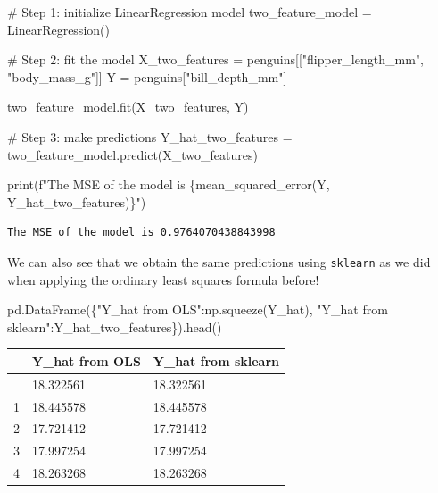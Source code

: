 \documentclass[
  letterpaper,
  DIV=11,
  numbers=noendperiod]{scrreprt}
\newenvironment{Shaded}{\begin{snugshade}}{\end{snugshade}}
\newcommand{\BuiltInTok}[1]{\textcolor[rgb]{0.00,0.23,0.31}{#1}}
\newcommand{\CommentTok}[1]{\textcolor[rgb]{0.37,0.37,0.37}{#1}}
\newcommand{\NormalTok}[1]{\textcolor[rgb]{0.00,0.23,0.31}{#1}}
\newcommand{\OperatorTok}[1]{\textcolor[rgb]{0.37,0.37,0.37}{#1}}
\newcommand{\SpecialCharTok}[1]{\textcolor[rgb]{0.37,0.37,0.37}{#1}}
\newcommand{\SpecialStringTok}[1]{\textcolor[rgb]{0.13,0.47,0.30}{#1}}
\newcommand{\StringTok}[1]{\textcolor[rgb]{0.13,0.47,0.30}{#1}}
\begin{document}
\begin{Shaded}
\begin{Highlighting}[]
\CommentTok{\# Step 1: initialize LinearRegression model}
\NormalTok{two\_feature\_model }\OperatorTok{=}\NormalTok{ LinearRegression()}

\CommentTok{\# Step 2: fit the model}
\NormalTok{X\_two\_features }\OperatorTok{=}\NormalTok{ penguins[[}\StringTok{"flipper\_length\_mm"}\NormalTok{, }\StringTok{"body\_mass\_g"}\NormalTok{]]}
\NormalTok{Y }\OperatorTok{=}\NormalTok{ penguins[}\StringTok{"bill\_depth\_mm"}\NormalTok{]}

\NormalTok{two\_feature\_model.fit(X\_two\_features, Y)}

\CommentTok{\# Step 3: make predictions}
\NormalTok{Y\_hat\_two\_features }\OperatorTok{=}\NormalTok{ two\_feature\_model.predict(X\_two\_features)}

\BuiltInTok{print}\NormalTok{(}\SpecialStringTok{f"The MSE of the model is }\SpecialCharTok{\{}\NormalTok{mean\_squared\_error(Y, Y\_hat\_two\_features)}\SpecialCharTok{\}}\SpecialStringTok{"}\NormalTok{)}
\end{Highlighting}
\end{Shaded}

\begin{verbatim}
The MSE of the model is 0.9764070438843998
\end{verbatim}

We can also see that we obtain the same predictions using
\texttt{sklearn} as we did when applying the ordinary least squares
formula before!

\begin{Shaded}
\begin{Highlighting}[]
\NormalTok{pd.DataFrame(\{}\StringTok{"Y\_hat from OLS"}\NormalTok{:np.squeeze(Y\_hat), }\StringTok{"Y\_hat from sklearn"}\NormalTok{:Y\_hat\_two\_features\}).head()}
\end{Highlighting}
\end{Shaded}

\begin{longtable}[]{@{}lll@{}}
\toprule\noalign{}
& Y\_hat from OLS & Y\_hat from sklearn \\
\midrule\noalign{}
\endhead
\bottomrule\noalign{}
\endlastfoot
0 & 18.322561 & 18.322561 \\
1 & 18.445578 & 18.445578 \\
2 & 17.721412 & 17.721412 \\
3 & 17.997254 & 17.997254 \\
4 & 18.263268 & 18.263268 \\
\end{longtable}
\end{document}
